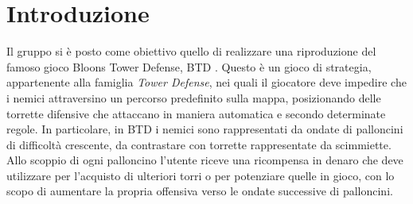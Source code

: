 \section*{Introduzione}
Il gruppo si è posto come obiettivo quello di realizzare una riproduzione del famoso gioco Bloons Tower Defense, BTD \cite{BaloonsTD5}.
Questo è un gioco di strategia, appartenente alla famiglia \textit{Tower Defense}, nei quali il giocatore
deve impedire che i nemici attraversino un percorso predefinito sulla mappa,
posizionando delle torrette difensive che attaccano in maniera automatica e secondo determinate regole.
In particolare, in BTD i nemici sono rappresentati da ondate di palloncini di difficoltà crescente,
da contrastare con torrette rappresentate da scimmiette.
Allo scoppio di ogni palloncino l'utente riceve una ricompensa in denaro
che deve utilizzare per l'acquisto di ulteriori torri o per potenziare quelle in gioco,
con lo scopo di aumentare la propria offensiva verso le ondate successive di palloncini.